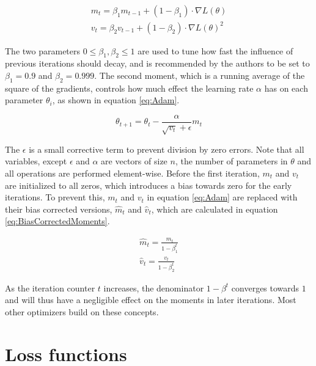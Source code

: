 \begin{equation}\label{eq:FirstSecondMoment}
    \begin{aligned}
    m_t = \beta_1 m_{t-1} + (1-\beta_1) \cdot \nabla L(\theta) \\
    v_t = \beta_2 v_{t-1} + (1 - \beta_2) \cdot \nabla L(\theta)^2
    \end{aligned}
\end{equation}

The two parameters $0 \leq \beta_1, \beta_2 \leq 1$ are used to tune how fast the influence of previous iterations should decay, and is recommended by the authors to be set to $\beta_1 = 0.9$ and $\beta_2 = 0.999$. The second moment, which is a running average of the square of the gradients, controls how much effect the learning rate $\alpha$ has on each parameter $\theta_i$, as shown in equation \ref{eq:Adam}.

\begin{equation}\label{eq:Adam}
    \theta_{t+1} = \theta_t - \frac{\alpha}{\sqrt{v_t} + \epsilon}m_t
\end{equation}

The $\epsilon$ is a small corrective term to prevent division by zero errors. Note that all variables, except $\epsilon$ and $\alpha$ are vectors of size $n$, the number of parameters in $\theta$ and all operations are performed element-wise. Before the first iteration, $m_t$ and $v_t$ are initialized to all zeros, which introduces a bias towards zero for the early iterations. To prevent this, $m_t$ and $v_t$ in equation \ref{eq:Adam} are replaced with their bias corrected versions, $\hat{m}_t$ and $\hat{v}_t$, which are calculated in equation \ref{eq:BiasCorrectedMoments}.

\begin{equation}\label{eq:BiasCorrectedMoments}
    \begin{aligned}
    \hat{m}_t = \frac{m_t}{1- \beta_1^t} \\
    \hat{v}_t = \frac{v_t}{1 - \beta_2^t}
    \end{aligned}
\end{equation}

As the iteration counter $t$ increases, the denominator $1 - \beta^t$ converges towards $1$ and will thus have a negligible effect on the moments in later iterations. Most other optimizers build on these concepts.

\section{Loss functions}

